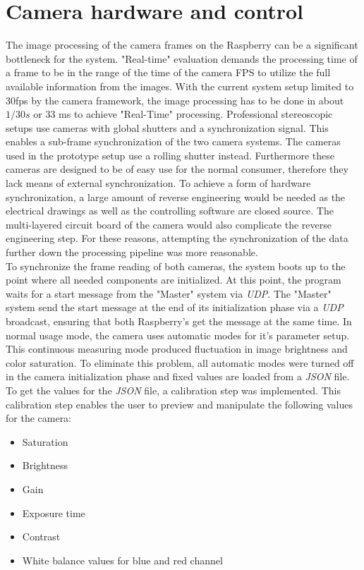 \section{Camera hardware and control}
The image processing of the camera frames on the Raspberry can be a significant bottleneck for the system. "Real-time" evaluation demands the processing time of a frame to be in the range of the time of the camera FPS to utilize the full available information from the images. With the current system setup limited to 30fps by the camera framework, the image processing has to be done in about $1/30s$ or 33 ms to achieve "Real-Time" processing. Professional stereoscopic setups use cameras with global shutters and a synchronization signal. This enables a sub-frame synchronization of the two camera systems. The cameras used in the prototype setup use a rolling shutter instead. Furthermore these cameras are designed to be of easy use for the normal consumer, therefore they lack means of external synchronization. To achieve a form of hardware synchronization, a large amount of reverse engineering would be needed as the electrical drawings as well as the controlling software are closed source. The multi-layered circuit board of the camera would also complicate the reverse engineering step.  For these reasons, attempting the synchronization of the data further down the processing pipeline was more reasonable.
\\To synchronize the  frame reading of both cameras, the system boots up to the point where all needed components are initialized. At this point, the program waits for a start message from the "Master" system via \textit{UDP}. The "Master" system send the start message at the end of its initialization phase via a \textit{UDP} broadcast, ensuring that both Raspberry's get the message at the same time.
In normal usage mode, the camera uses automatic modes for it's parameter setup. This continuous measuring mode produced fluctuation in image brightness and color saturation. To eliminate this problem, all automatic modes were turned off in the camera initialization phase and fixed values are loaded from a \textit{JSON} file. To get the values for the \textit{JSON} file, a calibration step was implemented.  This calibration step enables the user to preview and manipulate the following values for the camera:
\begin{itemize}
\item Saturation
\item Brightness
\item Gain
\item Exposure time
\item Contrast
\item White balance values for blue and red channel
\end{itemize}

